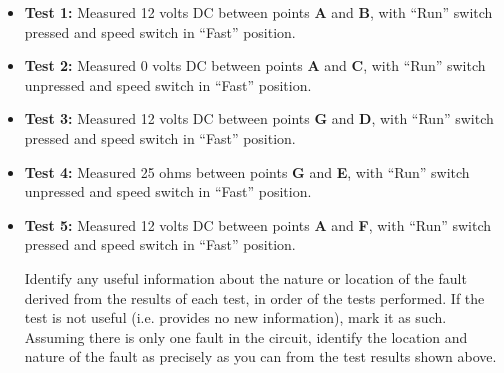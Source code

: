 \begin{itemize}
\item{} {\bf Test 1:} Measured 12 volts DC between points {\bf A} and {\bf B}, with ``Run'' switch pressed and speed switch in ``Fast'' position.
\vskip 25pt
\item{} {\bf Test 2:} Measured 0 volts DC between points {\bf A} and {\bf C}, with ``Run'' switch unpressed and speed switch in ``Fast'' position.
\vskip 25pt
\item{} {\bf Test 3:} Measured 12 volts DC between points {\bf G} and {\bf D}, with ``Run'' switch pressed and speed switch in ``Fast'' position.
\vskip 25pt
\item{} {\bf Test 4:} Measured 25 ohms between points {\bf G} and {\bf E}, with ``Run'' switch unpressed and speed switch in ``Fast'' position. 
\vskip 25pt
\item{} {\bf Test 5:} Measured 12 volts DC between points {\bf A} and {\bf F}, with ``Run'' switch pressed and speed switch in ``Fast'' position.
\vskip 25pt
\medskip

Identify any useful information about the nature or location of the fault derived from the results of each test, in order of the tests performed.  If the test is not useful (i.e. provides no new information), mark it as such.  Assuming there is only one fault in the circuit, identify the location and nature of the fault as precisely as you can from the test results shown above.

\vfil 

\eject







\end{itemize}
